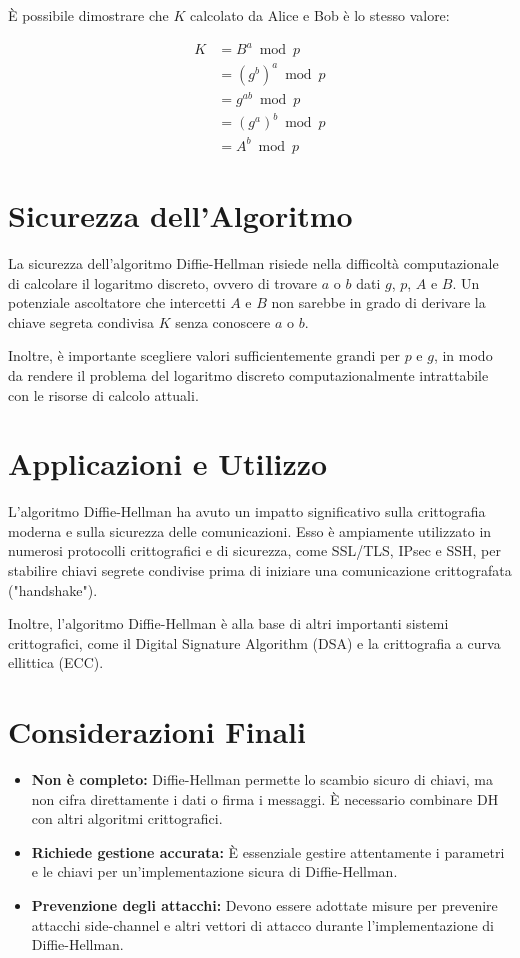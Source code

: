 \documentclass[a4paper,12pt]{report}
\begin{document}
È possibile dimostrare che $K$ calcolato da Alice e Bob è lo stesso valore:

\begin{align*}
K &= B^a \bmod p \\
  &= (g^b)^a \bmod p \\
  &= g^{ab} \bmod p \\
  &= (g^a)^b \bmod p \\
  &= A^b \bmod p
\end{align*}

\section{Sicurezza dell'Algoritmo}
La sicurezza dell'algoritmo Diffie-Hellman risiede nella difficoltà computazionale di calcolare il logaritmo discreto, ovvero di trovare $a$ o $b$ dati $g$, $p$, $A$ e $B$. Un potenziale ascoltatore che intercetti $A$ e $B$ non sarebbe in grado di derivare la chiave segreta condivisa $K$ senza conoscere $a$ o $b$.

Inoltre, è importante scegliere valori sufficientemente grandi per $p$ e $g$, in modo da rendere il problema del logaritmo discreto computazionalmente intrattabile con le risorse di calcolo attuali.

\section{Applicazioni e Utilizzo}
L'algoritmo Diffie-Hellman ha avuto un impatto significativo sulla crittografia moderna e sulla sicurezza delle comunicazioni. Esso è ampiamente utilizzato in numerosi protocolli crittografici e di sicurezza, come SSL/TLS, IPsec e SSH, per stabilire chiavi segrete condivise prima di iniziare una comunicazione crittografata ("handshake").

Inoltre, l'algoritmo Diffie-Hellman è alla base di altri importanti sistemi crittografici, come il Digital Signature Algorithm (DSA) e la crittografia a curva ellittica (ECC).

\section{Considerazioni Finali}
\begin{itemize}
    \item \textbf{Non è completo:} Diffie-Hellman permette lo scambio sicuro di chiavi, ma non cifra direttamente i dati o firma i messaggi. È necessario combinare DH con altri algoritmi crittografici.
    
    \item \textbf{Richiede gestione accurata:} È essenziale gestire attentamente i parametri e le chiavi per un'implementazione sicura di Diffie-Hellman.
    
    \item \textbf{Prevenzione degli attacchi:} Devono essere adottate misure per prevenire attacchi side-channel e altri vettori di attacco durante l'implementazione di Diffie-Hellman.
\end{itemize}
\end{document}
